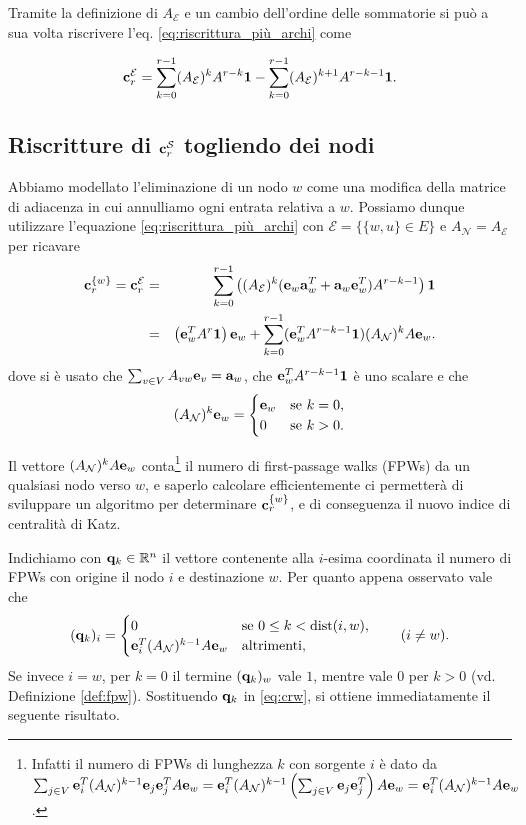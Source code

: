 \documentclass[a4paper]{article}
\newcommand{\dist}{{\rm dist}}
\newcommand{\RR}{\mathbb{R}}
\newcommand{\evec}{{\bf e}}
\newcommand{\cvec}{{\bf c}}
\newcommand{\avec}{{\bf a}}
\newcommand{\qvec}{{\bf q}}
\newcommand{\bone}{\mathbf{1}}
\newcommand{\cS}{\mathcal{S}}
\newcommand{\cE}{\mathcal{E}}
\newcommand{\cN}{\mathcal{N}}
\newcommand{\se}{\text{se }}
\newcommand{\altrimenti}{\text{altrimenti}}
\begin{document}
Tramite la definizione di $A_\cE$ e un cambio dell'ordine delle sommatorie si può a sua volta riscrivere l'eq. \eqref{eq:riscrittura_più_archi} come

\begin{equation} \label{eq:finale_più_archi}
	\cvec_r^\cE = \sum_{k=0}^{r-1} (A_\cE)^k A^{r-k} \bone - \sum_{k=0}^{r-1} (A_\cE)^{k+1} A^{r-k-1} \bone.
\end{equation}

\subsection{Riscritture di \texorpdfstring{$\cvec^\cS_r$}{cˢᵣ} togliendo dei nodi}

Abbiamo modellato l'eliminazione di un nodo $w$ come una modifica della matrice di
adiacenza in cui annulliamo ogni entrata relativa a $w$. Possiamo dunque
utilizzare l'equazione \eqref{eq:riscrittura_più_archi} con $\cE = \{ \{w, u\} \in E\}$ e $A_\cN = A_\cE$ per ricavare
\begin{eqnarray}
	\cvec_r^{\{w\}} = \cvec_r^\cE 
	&=& \sum_{k=0}^{r-1} \left( (A_\cE)^k (\evec_w \avec_w^T + \avec_w \evec_w^T) A^{r-k-1} \right) \bone \nonumber \\
	&=& \left(\evec_w^TA^{r}\bone\right) \evec_w+ \sum_{k=0}^{r-1} (\evec_w^TA^{r-k-1}\bone) (A_{\cN})^kA\evec_w. \label{eq:crw}
\end{eqnarray}
dove si è usato che $\sum_{v \in V} A_{vw} \evec_v = \avec_w$, che $\evec_w^T A^{r-k-1} \bone$ è uno scalare e che
\[(A_\cN)^k \evec_w = \begin{cases}
	\evec_w & \se k = 0, \\
	0 & \se k > 0.
	\end{cases} \]
	
	Il vettore $(A_{\cN})^kA\evec_w$ conta\footnote{
		Infatti il numero di FPWs di lunghezza $k$ con sorgente $i$ è dato da $\sum_{j \in V} \evec_i^T (A_\cN)^{k-1} \evec_j \evec_j^T A \evec_w = \evec_i^T (A_\cN)^{k-1} \left(\sum_{j \in V} \evec_j \evec_j^T\right) A \evec_w = \evec_i^T (A_\cN)^{k-1} A \evec_w$.
	} il numero di first-passage walks (FPWs) da un
	qualsiasi nodo verso $w$, e saperlo calcolare efficientemente ci permetterà di
	sviluppare un algoritmo per determinare $\cvec_r^{\{w\}}$, e di conseguenza il
	nuovo indice di centralità di Katz.
	
	Indichiamo con $\qvec_k \in \RR^n$ il vettore contenente alla $i$-esima
	coordinata il numero di FPWs con origine il nodo $i$ e destinazione $w$. Per quanto appena
	osservato vale che
	\[
		(\qvec_k)_i = \begin{cases}
		0 & \se 0 \leq k < \dist(i, w), \\
		\evec_i^T (A_\cN)^{k-1} A \evec_w & \altrimenti,
		\end{cases} \qquad (i \neq w).
	\]
	Se invece $i = w$, per $k=0$ il termine $(\qvec_k)_w$ vale $1$, mentre vale $0$ per $k>0$ (vd. Definizione \ref{def:fpw}). Sostituendo $\qvec_k$ in \eqref{eq:crw},
	si ottiene immediatamente il seguente risultato.
	
\end{document}
